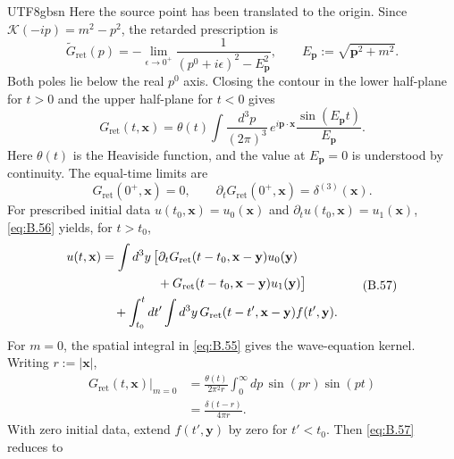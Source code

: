 \documentclass[11pt,a4paper,oneside]{report}
\begin{document}
\begin{CJK*}{UTF8}{gbsn}
Here the source point has been translated to the origin. Since $\mathcal K(-ip)=m^2-p^2$, the retarded prescription is
\begin{equation*}
\widetilde G_{\mathrm{ret}}(p)
=-\lim_{\epsilon\to0^+}\frac{1}{(p^0+i\epsilon)^2-E_{\mathbf p}^2},\qquad
E_{\mathbf p}:=\sqrt{\mathbf p^2+m^2}.
\tag{B.54}\label{eq:B.54}
\end{equation*}
Both poles lie below the real $p^0$ axis. Closing the contour in the lower half-plane for $t>0$ and the upper half-plane for $t<0$ gives
\begin{equation*}
{\displaystyle G_{\mathrm{ret}}(t,\mathbf x)
=\theta(t)\int\frac{d^3p}{(2\pi)^3}\,
e^{i\mathbf p\cdot\mathbf x}\frac{\sin(E_{\mathbf p}t)}{E_{\mathbf p}}.}
\tag{B.55}\label{eq:B.55}
\end{equation*}
Here $\theta(t)$ is the Heaviside function, and the value at $E_{\mathbf p}=0$ is understood by continuity. The equal-time limits are
\begin{equation*}
G_{\mathrm{ret}}(0^+,\mathbf x)=0,\qquad
\partial_tG_{\mathrm{ret}}(0^+,\mathbf x)=\delta^{(3)}(\mathbf x).
\tag{B.56}\label{eq:B.56}
\end{equation*}
For prescribed initial data $u(t_0,\mathbf x)=u_0(\mathbf x)$ and $\partial_tu(t_0,\mathbf x)=u_1(\mathbf x)$, \eqref{eq:B.56} yields, for $t>t_0$,
\begin{equation*}
{\displaystyle \begin{aligned}
u(t,\mathbf x)
&=\int d^3y\,\bigl[
\partial_tG_{\mathrm{ret}}(t-t_0,\mathbf x-\mathbf y)u_0(\mathbf y)\\
&\hspace{4.5em}+G_{\mathrm{ret}}(t-t_0,\mathbf x-\mathbf y)u_1(\mathbf y)\bigr]\\
&\quad+\int_{t_0}^{t}dt'\int d^3y\,
G_{\mathrm{ret}}(t-t',\mathbf x-\mathbf y)f(t',\mathbf y).
\end{aligned}}
\tag{B.57}\label{eq:B.57}
\end{equation*}
For $m=0$, the spatial integral in \eqref{eq:B.55} gives the wave-equation kernel. Writing $r:=|\mathbf x|$,
\begin{equation*}
\begin{aligned}
G_{\mathrm{ret}}(t,\mathbf x)\big|_{m=0}
&=\frac{\theta(t)}{2\pi^2r}\int_0^\infty dp\,\sin(pr)\sin(pt)\\
&={\displaystyle \frac{\delta(t-r)}{4\pi r}}.
\end{aligned}
\tag{B.58}\label{eq:B.58}
\end{equation*}
With zero initial data, extend $f(t',\mathbf y)$ by zero for $t'<t_0$. Then \eqref{eq:B.57} reduces to

\end{CJK*}
\end{document}
